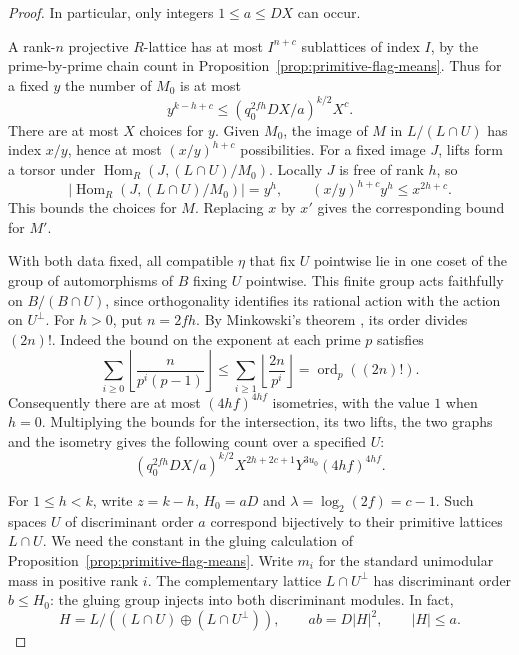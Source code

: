 \begin{proof}
In particular, only integers \(1\le a\le DX\) can occur.

A rank-\(n\) projective \(R\)-lattice has at most \(I^{n+c}\)
sublattices of index \(I\), by the prime-by-prime chain count in
Proposition~\ref{prop:primitive-flag-means}. Thus for a fixed \(y\)
the number of \(M_0\) is at most
\[
   y^{k-h+c}\le (q_0^{2fh}DX/a)^{k/2}X^c.
\]
There are at most \(X\) choices for \(y\). Given \(M_0\), the image
of \(M\) in \(L/(L\cap U)\) has index \(x/y\), hence at most
\((x/y)^{h+c}\) possibilities. For a fixed image \(J\), lifts form
a torsor under \(\operatorname{Hom}_R(J,(L\cap U)/M_0)\).
Locally \(J\) is free of rank \(h\), so
\[
 |\operatorname{Hom}_R(J,(L\cap U)/M_0)|=y^h,\qquad
             (x/y)^{h+c} y^h\le x^{2h+c}.
\]
This bounds the choices for \(M\). Replacing \(x\) by \(x'\) gives
the corresponding bound for \(M'\).

With both data fixed, all compatible \(\eta\) that fix \(U\)
pointwise lie in one coset of the group of automorphisms of \(B\)
fixing \(U\) pointwise. This finite group acts faithfully on
\(B/(B\cap U)\), since orthogonality identifies its rational
action with the action on \(U^\perp\). For \(h>0\), put \(n=2fh\).
By Minkowski's theorem \cite[\S1.1]{serre-finite-orders}, its
order divides \((2n)!\). Indeed the bound on the exponent at
each prime \(p\) satisfies
\[
 \sum_{i\ge0}\left\lfloor\frac{n}{p^i(p-1)}\right\rfloor
       \le \sum_{i\ge1}\left\lfloor\frac{2n}{p^i}\right\rfloor
       =\operatorname{ord}_p((2n)!) .
\]
Consequently there are at most \((4hf)^{4hf}\) isometries, with
the value \(1\) when \(h=0\). Multiplying the bounds for the
intersection, its two lifts, the two graphs and the isometry gives
the following count over a specified \(U\):
\begin{equation}\label{eq:zero-gram-one-space}
  (q_0^{2fh}DX/a)^{k/2}
        X^{2h+2c+1}Y^{3u_0}(4hf)^{4hf}.
\end{equation}

For \(1\le h<k\), write \(z=k-h\), \(H_0=aD\) and
\(\lambda=\log_2(2f)=c-1\). Such spaces \(U\) of discriminant order
\(a\) correspond bijectively to their primitive lattices \(L\cap U\).
We need the constant in the gluing calculation of
Proposition~\ref{prop:primitive-flag-means}. Write \(m_i\) for
the standard unimodular mass in positive rank \(i\). The complementary
lattice \(L\cap U^\perp\) has discriminant order \(b\le H_0\):
the gluing group injects into both discriminant modules. In fact,
\[
    H=L/((L\cap U)\oplus(L\cap U^\perp)),\qquad
    ab=D|H|^2,\qquad |H|\le a .
\]


\end{proof}

